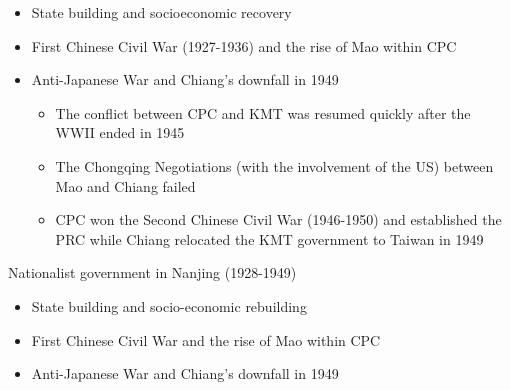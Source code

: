 \documentclass[
  10pt,
  ignorenonframetext,
]{beamer}
\begin{document}
\begin{frame}
\begin{itemize}
  \item State building and socioeconomic recovery
  \vspace{0.6cm}
  \item First Chinese Civil War (1927-1936) and the rise of Mao within CPC
  \vspace{0.6cm}
  \item Anti-Japanese War and Chiang's downfall in 1949
  \vspace{0.1cm}
  \begin{itemize}
    \item The conflict between CPC and KMT was resumed quickly after the WWII ended in 1945
    \item The Chongqing Negotiations (with the involvement of the US) between Mao and Chiang failed 
    \item CPC won the Second Chinese Civil War (1946-1950) and established the PRC while Chiang relocated the KMT government to Taiwan in 1949
  \end{itemize}
\end{itemize}
\end{frame}

\begin{frame}{Nationalist government in Nanjing (1928-1949)}
\label{nationalist-government-in-nanjing-1928-1949-1}
\begin{itemize}
  \item State building and socio-economic rebuilding
  \vspace{1cm}
  \item First Chinese Civil War and the rise of Mao within CPC
  \vspace{1cm}
  \item Anti-Japanese War and Chiang's downfall in 1949
\end{itemize}
\end{frame}
\end{document}
